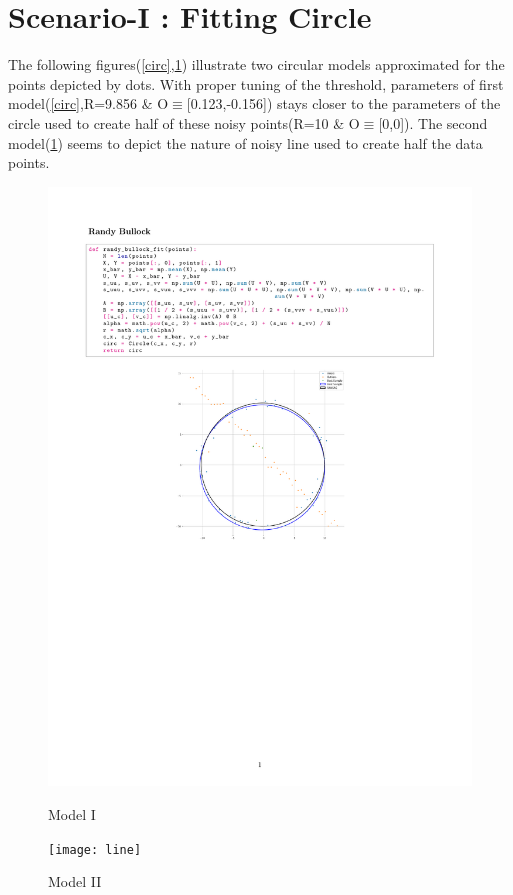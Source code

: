 \section*{Scenario-I : Fitting Circle}
\vspace*{-.2cm}
The following figures(\ref{circ},\ref{line}) illustrate two circular models approximated for the points depicted by dots. With proper tuning of the threshold, parameters of first model(\ref{circ},R=9.856 \& O$\equiv$[0.123,-0.156]) stays closer to the parameters of the circle used to create half of these noisy points(R=10 \& O$\equiv$[0,0]). The second model(\ref{line}) seems to depict the nature of noisy line used to create half the data points.
\begin{figure}[h]
    \begin{minipage}{.48\textwidth}
        \begin{center}
            \includegraphics[width=.75\columnwidth]{circle}
            \caption{Model I}
            \label{circ}
        \end{center}
    \end{minipage}
    \begin{minipage}{.48\textwidth}
        \begin{center}
            \texttt{[image: line]}
            \caption{Model II}
            \label{line}
        \end{center}
    \end{minipage}
\end{figure}
\newpage
